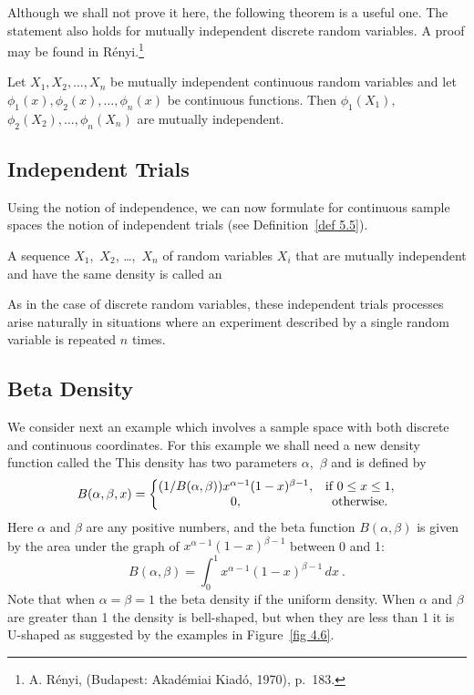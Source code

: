 Although we shall not prove it here, the following theorem is a useful one.  The
statement also holds for mutually independent discrete random variables.  A proof may be
found in R\'enyi.\footnote{A. R\'enyi,  (Budapest:
Akad\'emiai Kiad\'o, 1970), p.~183.}

\begin{theorem}\label{thm 4.3}
Let $X_1, X_2, \ldots, X_n$ be mutually independent continuous random variables and let
$\phi_1(x), \phi_2(x), \ldots, \phi_n(x)$ be continuous functions.  Then $\phi_1(X_1),$
\newline
$\phi_2(X_2), \ldots, \phi_n(X_n)$ are mutually independent.
\end{theorem}

\subsection*{Independent Trials}

Using the notion of independence, we can now formulate for continuous sample spaces the notion
of independent trials (see Definition~\ref{def 5.5}).

\begin{definition}\label{def 5.12} A sequence $X_1$,~$X_2$, \dots,~$X_n$ of random variables
$X_i$ that are mutually independent and have the same density is called an 
\end{definition}
\par
As in the case of discrete random variables, these independent trials processes arise
naturally in situations where an experiment described by a single random variable is repeated
$n$ times.

\subsection*{Beta Density}

We consider next an example which involves a sample space with both discrete
and continuous coordinates.  For this example we shall need a new density
function called the   This
density has two parameters
$\alpha$,~$\beta$ and is defined by
$$
B(\alpha,\beta,x) =  \left \{ \begin{matrix} 
(1/B(\alpha,\beta))x^{\alpha - 1}(1 - x)^{\beta - 1}, & {\mbox{if}}\,\, 0 \leq x \leq 1, \cr
                                                   0, & {\mbox{otherwise}}.\cr\end{matrix}\right. 
$$
Here $\alpha$ and $\beta$ are any positive numbers, and the beta function
$B(\alpha,\beta)$ is given by the area under the graph of $x^{\alpha - 1}(1 -
x)^{\beta - 1}$ between 0 and 1:
$$
B(\alpha,\beta) = \int_0^1 x^{\alpha - 1}(1 - x)^{\beta - 1}\,dx\ .
$$
Note that when $\alpha = \beta = 1$ the beta density if the uniform density. 
When $\alpha$ and $\beta$ are greater than 1 the density is bell-shaped, but
when they are less than 1 it is U-shaped as suggested by the examples in
Figure~\ref{fig 4.6}.

